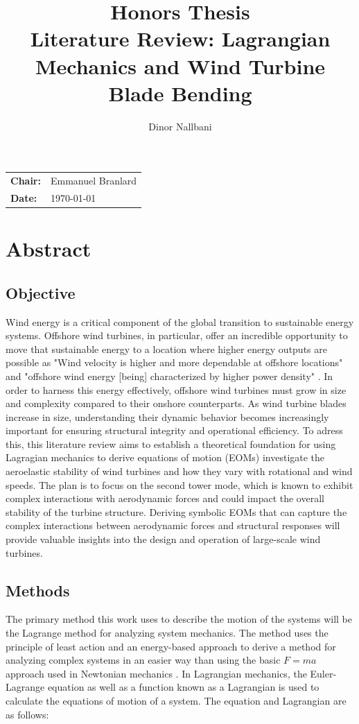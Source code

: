 \documentclass[onecolumn,draftcls]{IEEEtran}
\title{Honors Thesis\\
\large{Literature Review: Lagrangian Mechanics and Wind Turbine Blade Bending}}
\author{Dinor Nallbani}
\begin{document}
\begin{titlepage}
    \maketitle
    \begin{center}
        \vfill
        \begin{tabular}{ l l }
            \textbf{Chair:} & Emmanuel Branlard \\
            \textbf{Date:}  & \today
        \end{tabular}
        \vfill
    \end{center}
\end{titlepage}
\tableofcontents
\newpage

\section{Abstract}
\subsection*{Objective}
Wind energy is a critical component of the global transition to sustainable energy systems. Offshore wind turbines, in particular, offer an incredible opportunity to move that sustainable energy to a location where higher energy outputs are possible  as "Wind velocity is higher and more dependable at offshore locations" and "offshore wind energy [being] characterized by higher power density" \cite{Desalegn2023onshore}. In order to harness this energy effectively, offshore wind turbines must grow in size and complexity compared to their onshore counterparts. As wind turbine blades increase in size, understanding their dynamic behavior becomes increasingly important for ensuring structural integrity and operational efficiency. To adress this, this literature review aims to establish a theoretical foundation for using Lagragian mechanics to derive equations of motion (EOMs) investigate the aeroelastic stability of wind turbines and how they vary with rotational and wind speeds. The plan is to focus on the second tower mode, which is known to exhibit complex interactions with aerodynamic forces and could impact the overall stability of the turbine structure. Deriving symbolic EOMs that can capture the complex interactions between aerodynamic forces and structural responses will provide valuable insights into the design and operation of large-scale wind turbines.

\subsection*{Methods}
The primary method this work uses to describe the motion of the systems will be the Lagrange method for analyzing system mechanics. The method uses the principle of least action and an energy-based approach to derive a method for analyzing complex systems in an easier way than using the basic $F=ma$ approach used in Newtonian mechanics \cite{Branlard2025notes}. In Lagrangian mechanics, the Euler-Lagrange equation as well as a function known as a Lagrangian is used to calculate the equations of motion of a system. The equation and Lagrangian are as follows:
\end{document}
